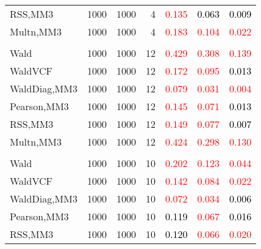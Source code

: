 \documentclass[
]{article}
\begin{document}
\begin{table}[H]
{\begin{tabular}[t]{lrrrrrr}
\hspace{1em}RSS,MM3 & 1000 & 1000 & 4 & \textcolor{red}{0.135} & \textcolor{black}{0.063} & \textcolor{black}{0.009}\\
\hspace{1em}Multn,MM3 & 1000 & 1000 & 4 & \textcolor{red}{0.183} & \textcolor{red}{0.104} & \textcolor{red}{0.022}\\
\addlinespace[0.3em]
\multicolumn{7}{l}{\textbf{1F 15V}}\\
\hspace{1em}Wald & 1000 & 1000 & 12 & \textcolor{red}{0.429} & \textcolor{red}{0.308} & \textcolor{red}{0.139}\\
\hspace{1em}WaldVCF & 1000 & 1000 & 12 & \textcolor{red}{0.172} & \textcolor{red}{0.095} & \textcolor{black}{0.013}\\
\hspace{1em}WaldDiag,MM3 & 1000 & 1000 & 12 & \textcolor{red}{0.079} & \textcolor{red}{0.031} & \textcolor{red}{0.004}\\
\hspace{1em}Pearson,MM3 & 1000 & 1000 & 12 & \textcolor{red}{0.145} & \textcolor{red}{0.071} & \textcolor{black}{0.013}\\
\hspace{1em}RSS,MM3 & 1000 & 1000 & 12 & \textcolor{red}{0.149} & \textcolor{red}{0.077} & \textcolor{black}{0.007}\\
\hspace{1em}Multn,MM3 & 1000 & 1000 & 12 & \textcolor{red}{0.424} & \textcolor{red}{0.298} & \textcolor{red}{0.130}\\
\addlinespace[0.3em]
\multicolumn{7}{l}{\textbf{2F 10V}}\\
\hspace{1em}Wald & 1000 & 1000 & 10 & \textcolor{red}{0.202} & \textcolor{red}{0.123} & \textcolor{red}{0.044}\\
\hspace{1em}WaldVCF & 1000 & 1000 & 10 & \textcolor{red}{0.142} & \textcolor{red}{0.084} & \textcolor{red}{0.022}\\
\hspace{1em}WaldDiag,MM3 & 1000 & 1000 & 10 & \textcolor{red}{0.072} & \textcolor{red}{0.034} & \textcolor{black}{0.006}\\
\hspace{1em}Pearson,MM3 & 1000 & 1000 & 10 & \textcolor{black}{0.119} & \textcolor{red}{0.067} & \textcolor{black}{0.016}\\
\hspace{1em}RSS,MM3 & 1000 & 1000 & 10 & \textcolor{black}{0.120} & \textcolor{red}{0.066} & \textcolor{red}{0.020}\\

\end{tabular}}
\end{table}
\end{document}

